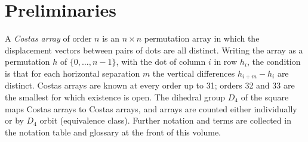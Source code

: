 \section{Preliminaries}\label{sec:notation}
A \emph{Costas array} of order $n$ is an $n\times n$ permutation array in which the displacement
vectors between pairs of dots are all distinct. Writing the array as a permutation $h$ of
$\{0,\dots,n-1\}$, with the dot of column $i$ in row $h_i$, the condition is that for each
horizontal separation $m$ the vertical differences $h_{i+m}-h_i$ are distinct. Costas arrays are
known at every order up to 31; orders 32 and 33 are the smallest for which existence is open. The
dihedral group $D_4$ of the square maps Costas arrays to Costas arrays, and arrays are counted
either individually or by $D_4$ orbit (equivalence class). Further notation and terms are collected
in the notation table and glossary at the front of this volume.
